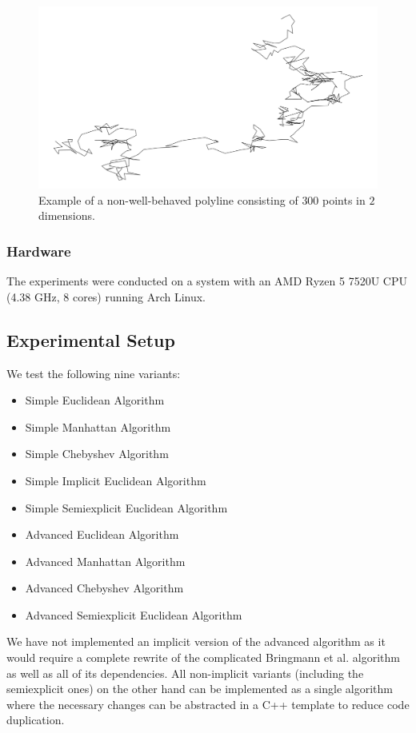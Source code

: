 \begin{figure}[b]
  \centering
	\includegraphics[scale=0.3]{./figures/non-well-behaved-300.png}
  \caption{Example of a non-well-behaved polyline consisting of \(300\) points in \(2\) dimensions.}
  \label{fig:non-well-behaved-300}
\end{figure}

\subsubsection{Hardware}
\label{subsubsec:hardware}
The experiments were conducted on a system with an AMD Ryzen 5 7520U CPU (4.38 GHz, 8 cores) running Arch Linux.

\subsection{Experimental Setup}
\label{subsec:exp_setup}

We test the following nine variants:
\begin{itemize}
	\item Simple Euclidean Algorithm 
	\item Simple Manhattan Algorithm 
	\item Simple Chebyshev Algorithm 
	\item Simple Implicit Euclidean Algorithm 
	\item Simple Semiexplicit Euclidean Algorithm 
	\item Advanced Euclidean Algorithm 
	\item Advanced Manhattan Algorithm 
	\item Advanced Chebyshev Algorithm 
	\item Advanced Semiexplicit Euclidean Algorithm 
\end{itemize}

We have not implemented an implicit version of the advanced algorithm as it would require a complete rewrite of the complicated Bringmann et al. algorithm as well as all of its dependencies. All non-implicit variants (including the semiexplicit ones) on the other hand can be implemented as a single algorithm where the necessary changes can be abstracted in a C++ template to reduce code duplication. 

